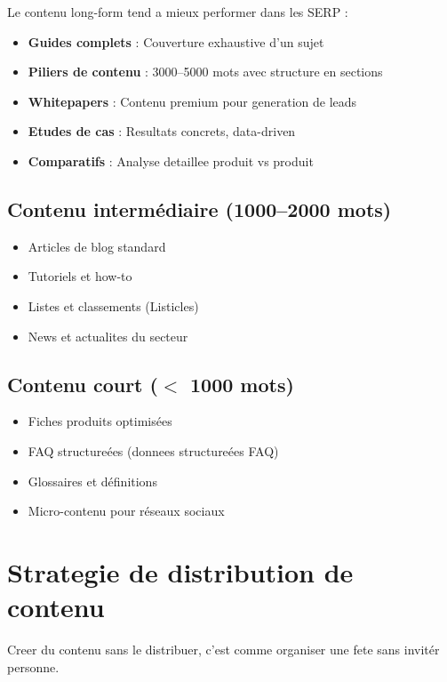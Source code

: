 Le contenu long-form tend a mieux performer dans les SERP :

\begin{itemize}
    \item \textbf{Guides complets} : Couverture exhaustive d'un sujet
    \item \textbf{Piliers de contenu} : 3000--5000 mots avec structure en sections
    \item \textbf{Whitepapers} : Contenu premium pour generation de leads
    \item \textbf{Etudes de cas} : Resultats concrets, data-driven
    \item \textbf{Comparatifs} : Analyse detaillee produit vs produit
\end{itemize}

\subsection{Contenu intermédiaire (1000--2000 mots)}

\begin{itemize}
    \item Articles de blog standard
    \item Tutoriels et how-to
    \item Listes et classements (Listicles)
    \item News et actualites du secteur
\end{itemize}

\subsection{Contenu court ($<$ 1000 mots)}

\begin{itemize}
    \item Fiches produits optimisées
    \item FAQ structureées (donnees structureées FAQ)
    \item Glossaires et définitions
    \item Micro-contenu pour réseaux sociaux
\end{itemize}

\section{Strategie de distribution de contenu}

Creer du contenu sans le distribuer, c'est comme organiser une fete sans invitér personne.

